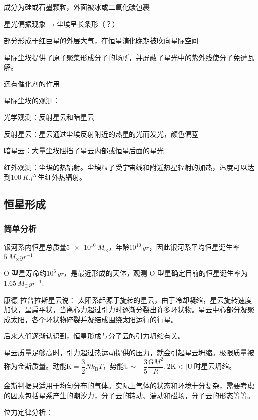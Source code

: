\documentclass[../天体物理基础.tex]{subfiles}
\begin{document}
成分为硅或石墨颗粒，外面被冰或二氧化碳包裹

星光偏振现象$\to$尘埃呈长条形（？）

部分形成于红巨星的外层大气，在恒星演化晚期被吹向星际空间

星际尘埃提供了原子聚集形成分子的场所，并屏蔽了星光中的紫外线使分子免遭瓦解。

还有催化剂的作用

星际尘埃的观测：

光学观测：反射星云和暗星云

反射星云：星云通过尘埃反射附近的热星的光而发光，颜色偏蓝

暗星云：大量尘埃阻挡了星云内部或恒星后面的星光

红外观测：尘埃的热辐射。尘埃粒子受宇宙线和附近热星辐射的加热，温度可以达到$\qty{100}{K}$,产生红外热辐射。

\subsection{恒星形成}

\subsubsection{简单分析}

银河系内恒星总质量$\qty{5e10}{M_{\odot}}$，年龄$10^{10}\,\unit{yr}$，因此银河系平均恒星诞生率$\qty{5}{M_{\odot}yr^{-1}}$.

O 型星寿命约$10^{6}\,\unit{yr}$，是最近形成的天体，观测 O 型星确定目前的恒星诞生率为$\qty{1.65}{M_{\odot}yr^{-1}}$.

康德{}-{}拉普拉斯星云说：
太阳系起源于旋转的星云，由于冷却凝缩，星云旋转速度加快，呈扁平状，当离心力超过引力时逐渐分裂出许多环状物。星云中心部分凝聚成太阳，各个环状物碎裂并凝结成围绕太阳运行的行星。

后来人们逐渐认识到，恒星形成与分子云的引力坍缩有关。

星云质量足够高时，引力超过热运动提供的压力，就会引起星云坍缩。极限质量被称为金斯质量。动能$\text{K}=\dfrac{3}{2}Nk_{\text{B}}T$，势能$\text{U}\sim-\dfrac{3}{5}\dfrac{\mathrm{G}M^{2}}{R},2\text{K}<\left\vert{}\text{U}\right\vert{}$时星云坍缩。

金斯判据只适用于均匀分布的气体。实际上气体的状态和环境十分复杂，需要考虑的因素包括星系产生的潮汐力，分子云的转动、湍动和磁场，分子云的形态等等。

位力定律分析：
\end{document}
